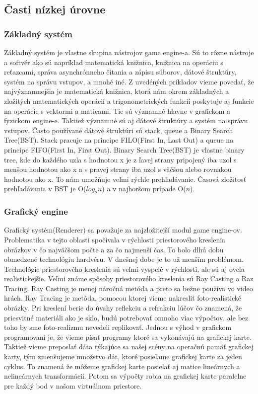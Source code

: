 \documentclass[10pt,oneside,slovak,a4paper,hidelinks]{article}
\begin{document}
	\subsection{Časti nízkej úrovne}
		\subsubsection{Základný systém}
			Základný systém je vlastne skupina nástrojov game engine-a. Sú to rôzne nástroje a softvér ako sú napríklad matematická knižnica, knižnica na operáciu s reťazcami, správa asynchrónneho čítania a zápisu súborov, dátové štruktúry, systém na správu vstupov, a mnohé iné. Z uvedéných príkladov vieme povedať, že najvýznamnejšia je matematická knižnica, ktorá nám okrem základných a zložitých matematických operácií a trigonometrických funkcií poskytuje aj funkcie na operácie s vektormi a maticami. Tie sú významné hlavne v grafickom a fyzickom engine-e. Taktiež významné sú aj dátové štruktúry a systém na správu vstupov. Často používané dátové štruktúri sú stack, queue a Binary Search Tree(BST). Stack pracuje na princípe FILO(First In, Last Out) a queue na princípe FIFO(First In, First Out). Binary Search Tree(BST) je vlastne binary tree, kde do každého uzla s hodnotou x je z ľavej strany pripojený iba uzol s menšou hodnotou ako x a s pravej strany iba uzol s väčšou alebo rovnakou hodnotou ako x. To nám umožňuje veľmi rýchle prehľadávanie. Časová zložitosť prehľadávania v BST je O($log_2n$) a v najhoršom prípade O($n$).
		\subsubsection{Grafický engine}
			Grafický systém(Renderer) sa považuje za najzložitejší modul game engine-ov. Problematika v tejto oblasti spočívala v rýchlosti priestorového kreslenia obrázkov v čo najväčšom počte a za čo najmenší čas. To bolo dlhú dobu obmedzené technológiu hardvéru. V dnešnej dobe je to už menším problémom. Technológie priestorového kreslenia sú veľmi vyspelé v rýchlosti, ale sú aj oveľa realistickejšie. Veľmi známe spôsoby priestorového kreslenia sú Ray Casting a Raz Tracing. Ray Casting je menej náročná metóda a preto sa bežne používa vo video hrách. Ray Tracing je metóda, pomocou ktorej vieme nakresliť foto-realistické obrázky. Pri kreslení berie do úvahy reflekciu a refrakciu lúčov čo znamená, že priesvitné materiáli ako je sklo, budú potrebovať omnoho viac výpočtov, ale bez toho by sme foto-realizmu nevedeli replikovať. Jednou s výhod v grafickom programovaní je, že vieme písať programy ktoré sa vykonávajú na grafickej karte. Taktiež vieme preposlať dáta týkajúce sa našej scény na operačnú pamäť grafickej karty, tým zmenšujeme množstvo dát, ktoré posielame grafickej karte za jeden cyklus. To znamená že môžeme grafickej karte posielať aj matice lineárnych a nelineárnych transformácií. Potom sa výpočty robia na grafickej karte paralelne pre každý bod v našom virtuálnom priestore.
\end{document}
